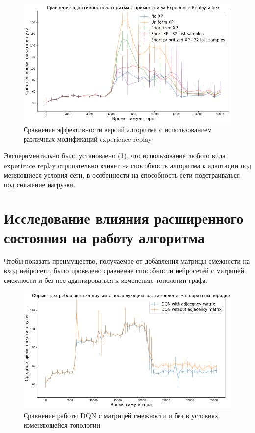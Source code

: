 \documentclass[specification, annotation]{itmo-student-thesis}
\begin{document}
\begin{figure}[!h]
  \caption{Сравнение эффективности версий алгоритма с использованием различных
    модификаций experience replay}\label{experiments-xp-variants}
  \centering
  \includegraphics[scale=0.6]{experiments-xp-variants}
\end{figure}

Экспериментально было установлено (\ref{experiments-xp-variants}), что
использование любого вида experience replay отрицательно влияет на способность
алгоритма к адаптации под меняющиеся условия сети, в особенности на способность
сети подстраиваться под снижение нагрузки.

\section{Исследование влияния расширенного состояния на работу алгоритма}\label{apx:amatrix}

Чтобы показать преимущество, получаемое от добавления матрицы смежности на вход
нейросети, было проведено сравнение способности нейросетей с матрицей смежности и
без нее адаптироваться к изменению топологии графа.

\begin{figure}[!h]
  \caption{Сравнение работы DQN с матрицей смежности и без в условиях
    изменяющейся топологии}\label{experiment-with-without-amatrix}
  \centering
  \includegraphics[scale=0.6]{experiment-with-without-amatrix}
\end{figure}
\end{document}
